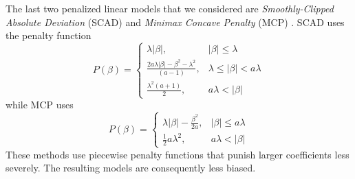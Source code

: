 \documentclass[final,onefignum,onetabnum]{siuro210301}
\begin{document}
	The last two penalized linear models that we considered are \textit{Smoothly-Clipped Absolute Deviation} (SCAD) and \textit{Minimax Concave Penalty} (MCP) \cite{fan2001variable, wang2007group, zhang2010nearly}. SCAD uses the penalty function
	\begin{equation}
		P(\beta) = \left\{\begin{array}{ll}
				\lambda \vert \beta \vert, & \vert \beta \vert \leq \lambda \\
				\frac{2a\lambda\vert\beta\vert - \beta^2 - \lambda^2}{(a - 1)}, & \lambda \leq \vert \beta \vert < a\lambda \\
				\frac{\lambda^2(a+1)}{2}, & a\lambda < \vert \beta \vert
			\end{array}\right.
	\end{equation}
	while MCP uses
	\begin{equation}
		P(\beta) = \left\{\begin{array}{ll}
			\lambda\vert \beta \vert - \frac{\beta^2}{2a}, & \vert \beta \vert \leq a\lambda \\
			\frac{1}{2}a\lambda^2, & a\lambda < \vert \beta \vert
		\end{array}\right.
	\end{equation}
	These methods use piecewise penalty functions that punish larger coefficients less severely. The resulting models are consequently less biased. 
\end{document}
